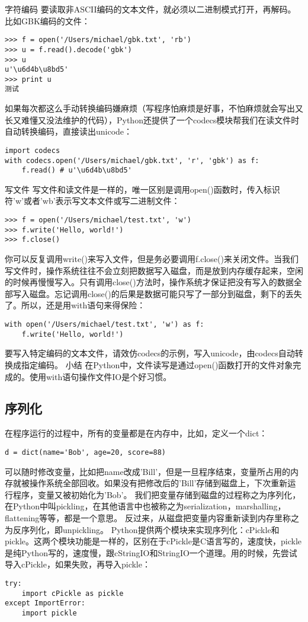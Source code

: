 \documentclass[twoside,11pt]{book}
\begin{document}
字符编码
要读取非ASCII编码的文本文件，就必须以二进制模式打开，再解码。比如GBK编码的文件：
\begin{lstlisting}
>>> f = open('/Users/michael/gbk.txt', 'rb')
>>> u = f.read().decode('gbk')
>>> u
u'\u6d4b\u8bd5'
>>> print u
测试
\end{lstlisting}

如果每次都这么手动转换编码嫌麻烦（写程序怕麻烦是好事，不怕麻烦就会写出又长又难懂又没法维护的代码），Python还提供了一个codecs模块帮我们在读文件时自动转换编码，直接读出unicode：
\begin{lstlisting}
import codecs
with codecs.open('/Users/michael/gbk.txt', 'r', 'gbk') as f:
    f.read() # u'\u6d4b\u8bd5'
\end{lstlisting}

写文件
写文件和读文件是一样的，唯一区别是调用open()函数时，传入标识符'w'或者'wb'表示写文本文件或写二进制文件：
\begin{lstlisting}
>>> f = open('/Users/michael/test.txt', 'w')
>>> f.write('Hello, world!')
>>> f.close()
\end{lstlisting}

你可以反复调用write()来写入文件，但是务必要调用f.close()来关闭文件。当我们写文件时，操作系统往往不会立刻把数据写入磁盘，而是放到内存缓存起来，空闲的时候再慢慢写入。只有调用close()方法时，操作系统才保证把没有写入的数据全部写入磁盘。忘记调用close()的后果是数据可能只写了一部分到磁盘，剩下的丢失了。所以，还是用with语句来得保险：
\begin{lstlisting}
with open('/Users/michael/test.txt', 'w') as f:
    f.write('Hello, world!')
\end{lstlisting}

要写入特定编码的文本文件，请效仿codecs的示例，写入unicode，由codecs自动转换成指定编码。
小结
在Python中，文件读写是通过open()函数打开的文件对象完成的。使用with语句操作文件IO是个好习惯。

\subsection{序列化}
在程序运行的过程中，所有的变量都是在内存中，比如，定义一个dict：
\begin{lstlisting}
d = dict(name='Bob', age=20, score=88)
\end{lstlisting}

可以随时修改变量，比如把name改成'Bill'，但是一旦程序结束，变量所占用的内存就被操作系统全部回收。如果没有把修改后的'Bill'存储到磁盘上，下次重新运行程序，变量又被初始化为'Bob'。
我们把变量存储到磁盘的过程称之为序列化，在Python中叫pickling，在其他语言中也被称之为serialization，marshalling，flattening等等，都是一个意思。
反过来，从磁盘把变量内容重新读到内存里称之为反序列化，即unpickling。
Python提供两个模块来实现序列化：cPickle和pickle。这两个模块功能是一样的，区别在于cPickle是C语言写的，速度快，pickle是纯Python写的，速度慢，跟cStringIO和StringIO一个道理。用的时候，先尝试导入cPickle，如果失败，再导入pickle：
\begin{lstlisting}
try:
    import cPickle as pickle
except ImportError:
    import pickle
\end{lstlisting}
\end{document}
